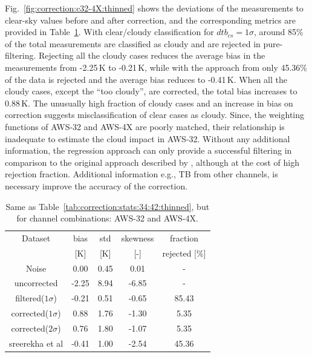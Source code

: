 \documentclass[12pt]{article}
\begin{document}
Fig.~\ref{fig:correction:c32-4X:thinned} shows the deviations of the
measurements to clear-sky values before and after correction, and the
corresponding metrics are provided in Table~\ref{tab:correction:stats:32:4X}.
With clear/cloudy classification for $dtb_{cs} = 1\sigma$, around 85\% of the
total measurements are classified as cloudy and are rejected in pure-filtering.
Rejecting all the cloudy cases reduces the average bias in the measurements
from -2.25\,K to -0.21\,K, while with the approach from
\citet{rekha2012potential} only 45.36\% of the data is rejected and the average
bias reduces to -0.41\,K. When all the cloudy cases, except the ``too cloudy'',
are corrected, the total bias increases to 0.88\,K. The unusually high fraction
of cloudy cases and an increase in bias on correction suggests misclassification
of clear cases as cloudy. Since, the weighting functions of AWS-32 and AWS-4X
are poorly matched, their relationship is inadequate to estimate the cloud
impact in AWS-32. Without any additional information, the regression approach
can only provide a successful filtering in comparison to the original approach
described by \citet{rekha2012potential}, although at the cost of high rejection
fraction. Additional information e.g., TB from other channels, is necessary
improve the accuracy of the correction.

\begin{table}[!h]
	\centering
	\begin{tabular}[b]{c|c|c|c|c}
		Dataset  		  &   bias &   std & skewness & fraction \\
						&   [K]  &   [K] & [-] 		& rejected [\%]\\
		\hline
Noise             		&  0.00 &  0.45 &               0.01 &                - \\
uncorrected       		&  -2.25 &  8.94 &              -6.85 &                - \\
filtered($1\sigma$)  	&  -0.21 &  0.51 &              -0.65 &               85.43 \\
corrected($1\sigma$) 	&   0.88 &  1.76 &              -1.30 &                5.35 \\
corrected($2\sigma$) 	&   0.76 &  1.80 &              -1.07 &                5.35 \\
sreerekha et al   		&  -0.41 &  1.00 &              -2.54 &               45.36 \\
		\hline
	\end{tabular}
	\caption{Same as Table~\ref{tab:correction:stats:34:42:thinned}, but for channel combinations: AWS-32 and AWS-4X.  }
	\label{tab:correction:stats:32:4X}
\end{table}
\end{document}
